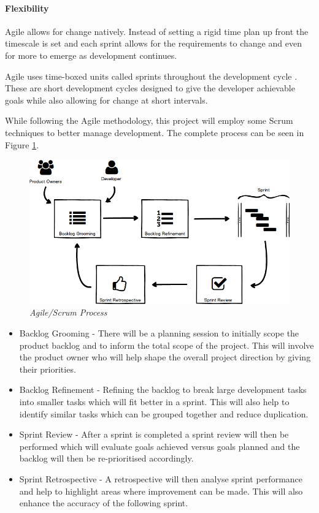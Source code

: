 \paragraph{Flexibility} Agile allows for change natively. Instead of setting a rigid time plan up front the timescale is set and each sprint allows for the requirements to change and even for more to emerge as development continues.

Agile uses time-boxed units called sprints throughout the development cycle \citep{Agile2016}. These are short development cycles designed to give the developer achievable goals while also allowing for change at short intervals.

While following the Agile methodology, this project will employ some Scrum techniques to better manage development. The complete process can be seen in Figure \ref{fig:agile}.

\begin{figure}[!ht]
\centering
\includegraphics*[width=\textwidth]{images/scrum_process}
\caption{\em Agile/Scrum Process}
\label{fig:agile}
\end{figure}

\begin{itemize}
	\item Backlog Grooming - There will be a planning session to initially scope the product backlog and to inform the total scope of the project. This will involve the product owner who will help shape the overall project direction by giving their priorities.
	\item Backlog Refinement - Refining the backlog to break large development tasks into smaller tasks which will fit better in a sprint. This will also help to identify similar tasks which can be grouped together and reduce duplication.
	\item Sprint Review - After a sprint is completed a sprint review will then be performed which will evaluate goals achieved versus goals planned and the backlog will then be re-prioritised accordingly.
	\item Sprint Retrospective - A retrospective will then analyse sprint performance and help to highlight areas where improvement can be made. This will also enhance the accuracy of the following sprint.
\end{itemize}

